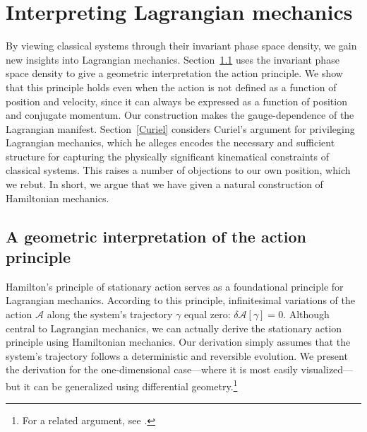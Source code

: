 \documentclass[12pt, twoside]{article}
\begin{document}
\section{Interpreting Lagrangian mechanics}
\label{Lagrangian}

By viewing classical systems through their invariant phase space density, we gain new insights into Lagrangian mechanics. Section~\ref{action} uses the invariant phase space density to give a geometric interpretation the action principle. We show that this principle holds even when the action is not defined as a function of position and velocity, since it can always be expressed as a function of position and conjugate momentum. Our construction makes the gauge-dependence of the Lagrangian manifest. Section~\ref{Curiel} considers Curiel's \parencites*[]{Curiel} argument for privileging Lagrangian mechanics, which he alleges encodes the necessary and sufficient structure for capturing the physically significant kinematical constraints of classical systems. This raises a number of objections to our own position, which we rebut. In short, we  argue that we have given a natural construction of Hamiltonian mechanics.


\subsection{A geometric interpretation of the action principle}
\label{action}


Hamilton's principle of stationary action serves as a foundational principle for Lagrangian mechanics. According to this principle, infinitesimal variations of the action $ \mathscr{A}$ along the system's trajectory $\gamma $ equal zero: $\delta  \mathscr{A}[\gamma] = 0 $. Although central to Lagrangian mechanics, we can actually derive the stationary action principle using Hamiltonian mechanics. Our derivation simply assumes that the system's trajectory follows a deterministic and reversible evolution. We present the derivation for the one-dimensional case---where it is most easily visualized---but it can be generalized using differential geometry.\footnote{For a related argument, see \textcites[236--37, 243--45]{Arnold}.}
\end{document}
